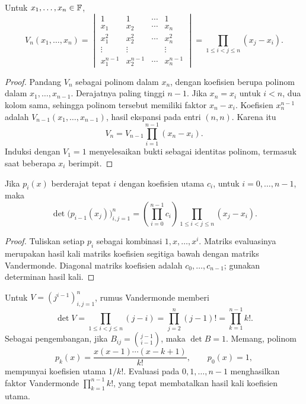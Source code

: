 \begin{thm}[Vandermonde]
      \label{det:rumus-vandermonde}
      Untuk $x_1,\ldots,x_n\in\mathbb{F}$,
      \[
            V_n(x_1,\ldots,x_n)=
            \begin{vmatrix}
                  1         & 1         & \cdots & 1         \\x_1&x_2&\cdots&x_n\\
                  x_1^2     & x_2^2     & \cdots & x_n^2     \\
                  \vdots    & \vdots    &        & \vdots    \\
                  x_1^{n-1} & x_2^{n-1} & \cdots & x_n^{n-1}
            \end{vmatrix}
            =\prod_{1\le i<j\le n}(x_j-x_i).
      \]
\end{thm}
\begin{proof}
      Pandang $V_n$ sebagai polinom dalam $x_n$, dengan koefisien berupa polinom
      dalam $x_1,\ldots,x_{n-1}$. Derajatnya paling tinggi $n-1$.
      Jika $x_n=x_i$ untuk $i<n$, dua kolom sama, sehingga polinom tersebut
      memiliki faktor $x_n-x_i$. Koefisien $x_n^{n-1}$ adalah
      $V_{n-1}(x_1,\ldots,x_{n-1})$, hasil ekspansi pada entri $(n,n)$.
      Karena itu
      \[
            V_n=V_{n-1}\prod_{i=1}^{n-1}(x_n-x_i).
      \]
      Induksi dengan $V_1=1$ menyelesaikan bukti sebagai identitas polinom,
      termasuk saat beberapa $x_i$ berimpit.
\end{proof}

\begin{prop}
      Jika $p_i(x)$ berderajat tepat $i$ dengan koefisien utama $c_i$,
      untuk $i=0,\ldots,n-1$, maka
      \[
            \det\bigl(p_{i-1}(x_j)\bigr)_{i,j=1}^n
            =\left(\prod_{i=0}^{n-1}c_i\right)
            \prod_{1\le i<j\le n}(x_j-x_i).
      \]
\end{prop}
\begin{proof}
      Tuliskan setiap $p_i$ sebagai kombinasi $1,x,\ldots,x^i$.
      Matriks evaluasinya merupakan hasil kali matriks koefisien segitiga
      bawah dengan matriks Vandermonde. Diagonal matriks koefisien adalah
      $c_0,\ldots,c_{n-1}$; gunakan determinan hasil kali.
\end{proof}

\begin{exam}
      Untuk $V=(j^{i-1})_{i,j=1}^n$, rumus Vandermonde memberi
      \[
            \det V=\prod_{1\le i<j\le n}(j-i)
            =\prod_{j=2}^n(j-1)!=\prod_{k=1}^{n-1}k!.
      \]
      Sebagai pengembangan, jika $B_{ij}=\binom{j-1}{i-1}$, maka
      $\det B=1$. Memang, polinom
      \[
            p_k(x)=\frac{x(x-1)\cdots(x-k+1)}{k!},\qquad p_0(x)=1,
      \]
      mempunyai koefisien utama $1/k!$. Evaluasi pada $0,1,\ldots,n-1$
      menghasilkan faktor Vandermonde $\prod_{k=1}^{n-1}k!$, yang tepat
      membatalkan hasil kali koefisien utama.
\end{exam}

